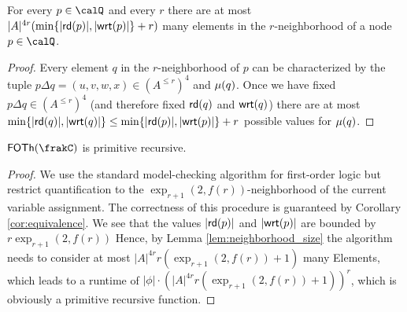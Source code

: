 


\begin{lemma}\label{lem:neighborhood_size}
	For every $p\in \Qx$ and every $r$ there are at most $|A|^{4r} (\min\{|\mathsf{rd}(p)|, |\mathsf{wrt}(p)|\} + r)$ many elements in the $r$-neighborhood of a node $p\in \Qx$. 
\end{lemma}
\begin{proof}
	Every element $q$ in the $r$-neighborhood of $p$ can be characterized by the tuple $p\Delta q = (u,v, w, x)\in (A^{\leq r})^4$ and $\mu(q)$. Once we have fixed  
	$p\Delta q \in (A^{\leq r})^4$ (and therefore fixed $\mathsf{rd}(q)$ and $\mathsf{wrt}(q)$) there are at most $\min\{ |\mathsf{rd}(q)|, |\mathsf{wrt}(q)| \} \leq \min\{ |\mathsf{rd}(p)|, |\mathsf{wrt}(p)| \} + r$ possible values for $\mu(q)$.
\end{proof}

\begin{theorem}
	$\FOTh{\frakC}$ is primitive recursive.
\end{theorem}
\begin{proof}
	We use the standard model-checking algorithm for first-order logic but restrict quantification to the $\exp_{r+1}(2,f(r))$-neighborhood of the current variable assignment. The correctness of this procedure is guaranteed by Corollary \ref{cor:equivalence}.
	We see that the values $|\mathsf{rd}(p)|$ and $|\mathsf{wrt}(p)|$ are bounded by $r\exp_{r+1}(2,f(r))$
	Hence, by Lemma \ref{lem:neighborhood_size} the algorithm needs to consider at most $|A|^{4r} r(\exp_{r+1}(2,f(r)) +1)$ many Elements, which leads to a runtime of
	$|\phi| \cdot (|A|^{4r} r(\exp_{r+1}(2,f(r)) +1))^r$, which is obviously a primitive recursive function. 
\end{proof}